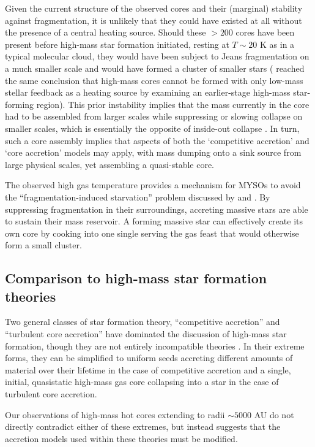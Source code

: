 \documentclass{emulateapj}
\begin{document}
Given the current structure of the observed cores and their (marginal)
stability against fragmentation, it is unlikely that they could have existed at
all without the presence of a central heating source.  Should these $>200$
\msun cores have been present before high-mass star formation initiated,
resting at $T\sim20$ K as in a typical molecular cloud, they would have been
subject to Jeans fragmentation on a much smaller scale and would have formed a
cluster of smaller stars (\citet{Longmore2011a} reached the same conclusion
that high-mass cores cannot be formed with only low-mass stellar feedback as a
heating source by examining an earlier-stage high-mass star-forming region).
This prior instability implies that the mass currently in the core had to be
assembled from larger scales while suppressing or slowing collapse on smaller
scales, which is essentially the opposite of inside-out collapse
\citep{Naranjo-Romero2015a}.  In turn, such a core assembly implies that
aspects of both the `competitive accretion' and `core accretion' models may
apply, with mass dumping onto a sink source from large physical scales, yet
assembling a quasi-stable core.

The observed high gas temperature provides a mechanism for MYSOs to avoid the
``fragmentation-induced starvation'' problem discussed by
\citet{Peters2010a,Peters2010c} and \citet{Girichidis2012b}.  By suppressing
fragmentation in their surroundings, accreting massive stars are able to
sustain their mass reservoir.  A forming massive star can effectively create
its own core by cooking into one single serving the gas feast that would
otherwise form a small cluster.

\subsection{Comparison to high-mass star formation theories}
\label{sec:sftheories}
Two general classes of star formation theory, ``competitive accretion'' and
``turbulent core accretion'' have dominated the discussion of  high-mass star
formation, though they are
not entirely incompatible theories \citep{Schilke2016a}.  In their extreme forms,
they can be simplified to uniform seeds accreting different amounts of material
over their lifetime in the case of competitive accretion and a single, initial,
quasistatic high-mass gas core collapsing into a star in the case of turbulent
core accretion.  

Our observations of high-mass hot cores extending to radii $\sim5000$ AU do
not directly contradict either of these extremes, but instead suggests
that the accretion models used within these theories must be modified.
\end{document}
